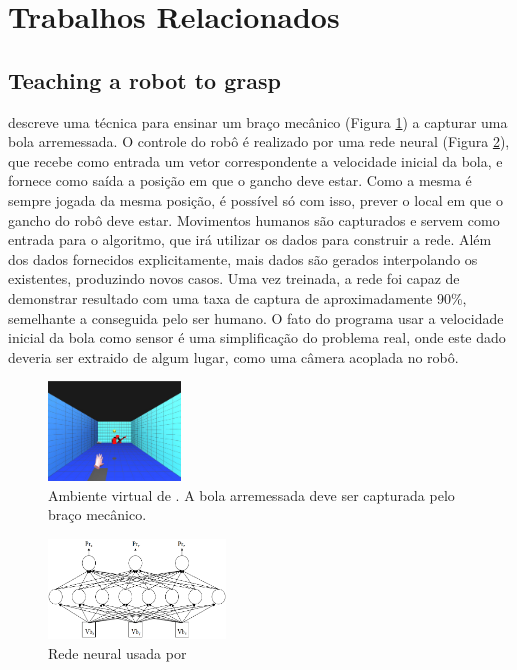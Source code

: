 \documentclass{article}
\begin{document}
\section{Trabalhos Relacionados}

\subsection{Teaching a robot to grasp}
 descreve uma técnica para ensinar um braço mecânico (Figura \ref{fig:hamon:fig1}) a capturar uma bola arremessada. O controle do robô é realizado por uma rede neural (Figura \ref{fig:hamon:fig2}), que recebe como entrada um vetor correspondente a velocidade inicial da bola, e fornece como saída a posição em que o gancho deve estar. Como a mesma é sempre jogada da mesma posição, é possível só com isso, prever o local em que o gancho do robô deve estar. Movimentos humanos são capturados e servem como entrada para o algoritmo, que irá utilizar os dados para construir a rede. Além dos dados fornecidos explicitamente, mais dados são gerados interpolando os existentes, produzindo novos casos. Uma vez treinada, a rede foi capaz de demonstrar resultado com uma taxa de captura de aproximadamente 90\%, semelhante a conseguida pelo ser humano. O fato do programa usar a velocidade inicial da bola como sensor é uma simplificação do problema real, onde este dado deveria ser extraido de algum lugar, como uma câmera acoplada no robô.

\begin{figure}[ht]
  \centering
  \includegraphics[height=100px]{images/teaching_env.png}
  \caption{Ambiente virtual de . A bola arremessada deve ser capturada pelo braço mecânico.}
  \label{fig:hamon:fig1}
\end{figure}

\begin{figure}[ht]
  \centering
  \includegraphics[height=100px]{images/teaching_neural.png}
  \caption{Rede neural usada por }
  \label{fig:hamon:fig2}
\end{figure}
\end{document}
